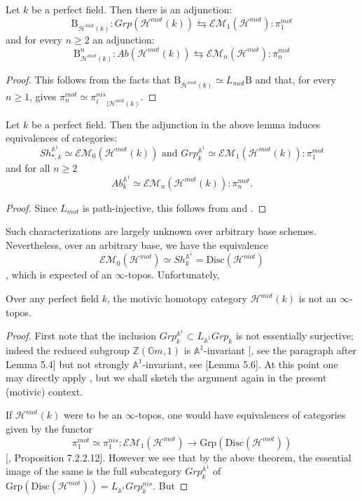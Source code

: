 \begin{lem}
    Let $k$ be a perfect field. Then there is an adjunction:
    $$\mathrm{B}^{}_{\mathcal{H}^{mot}(k)}:Grp (\mathcal{H}^{mot}(k))\leftrightarrows \mathcal{EM}_{1}(\mathcal{H}^{mot}): \pi_1^{mot}$$ and for every $n\geq 2$ an adjunction:
    $$\mathrm{B}^{n}_{\mathcal{H}^{mot}(k)}:Ab(\mathcal{H}^{mot}(k))\leftrightarrows \mathcal{EM}_{n}(\mathcal{H}^{mot}): \pi_n^{mot}$$ 
\end{lem}
\begin{proof}
    This follows from the facts that $\mathrm{B}_{\mathcal{H}^{mot}(k)}\simeq L_{mot}\mathrm{B}$ and that, for every $n\geq 1$,  gives $\pi_n^{mot}\simeq {\pi_i^{nis}}_{|\mathcal{H}^{mot}(k)}$.
\end{proof}
\begin{thm}\label{motivic em}
Let $k$ be a perfect field. Then the adjunction in the above lemma 
induces equivalences of categories: $$Sh_{*,k}^{\mathbb{A}^1}\simeq \mathcal{EM}_0(\mathcal{H}^{mot}(k)) \text{ and  }Grp_k^{\mathbb{A}^1}\simeq \mathcal{EM}_1(\mathcal{H}^{mot}(k)): \pi_1^{mot}$$ and for all $n\geq 2$ $$Ab_k^{\mathbb{A}^1}\simeq \mathcal{EM}_n(\mathcal{H}^{mot}(k)):\pi_n^{mot}.$$
\end{thm}
\begin{proof}
Since $L_{mot}$ is path-injective, this follows from  and .
\end{proof}
 Such characterizations are largely unknown over arbitrary base schemes. Nevertheless, over an arbitrary base, we have the equivalence $$\mathcal{EM}_0(\mathcal{H}^{mot})\simeq Sh_k^{\mathbb{A}^1}=\text{Disc}(\mathcal{H}^{mot})$$, which is expected of an $\infty$-topos. Unfortunately, 
 \begin{cor}\label{mot not topos}
    Over any perfect field $k$, the motivic homotopy category $\mathcal{H}^{mot}(k)$ is not an $\infty$-topos. 
    \end{cor} 
    \begin{proof}
     First note that the inclusion $Grp^{\mathbb{A}^1}_k\subset L_{\mathbb{A}^1}Grp_k$ is not essentially surjective; indeed the reduced subgroup $\mathbb{Z}(\mathbb{G}m,1)$ is $\mathbb{A}^1$-invariant [\cite{choudhury2014connectivity}, see the paragraph after Lemma 5.4] but not strongly $\mathbb{A}^1$-invariant, see [Lemma 5.6]. At this point one may directly apply , but we shall sketch the argument again in the present (motivic) context. 

     If $\mathcal{H}^{mot}(k)$ were to be an $\infty$-topos, one would have equivalences of categories given by the functor $$\pi_1^{mot}\simeq \pi_1^{nis}:\mathcal{EM}_1(\mathcal{H}^{mot})\to  \text{Grp}(\text{Disc}(\mathcal{H}^{mot})) $$ [\cite{lurie2009higher}, Proposition 7.2.2.12]. However we see that by the above theorem, the essential image of the same is the full subcategory $Grp_k^{\mathbb{A}^1}$ of $\text{Grp}(\text{Disc}(\mathcal{H}^{mot})) = L_{\mathbb{A}^1}Grp_k^{nis}$.  But
     \end{proof}

